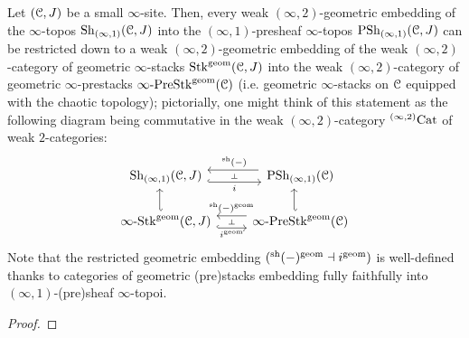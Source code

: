                 \begin{theorem} \label{theorem: (infinity,1)_sheafification_of_derived_geometric_prestacks}
                    Let $(\mathcal{C}, J)$ be a small $\infty$-site. Then, every weak $(\infty, 2)$-geometric embedding of the $\infty$-topos $\mathrm{Sh}_{(\infty, 1)}(\mathcal{C}, J)$ into the $(\infty, 1)$-presheaf $\infty$-topos $\mathrm{PSh}_{(\infty, 1)}(\mathcal{C}, J)$ can be restricted down to a weak $(\infty, 2)$-geometric embedding of the weak $(\infty, 2)$-category of geometric $\infty$-stacks $\mathrm{Stk}^{\mathrm{geom}}(\mathcal{C}, J)$ into the weak $(\infty, 2)$-category of geometric $\infty$-prestacks $\infty\text{-}\mathrm{Pre}\mathrm{Stk}^{\mathrm{geom}}(\mathcal{C})$ (i.e. geometric $\infty$-stacks on $\mathcal{C}$ equipped with the chaotic topology); pictorially, one might think of this statement as the following diagram being commutative in the weak $(\infty, 2)$-category ${}^{(\infty, 2)}\mathrm{Cat}$ of weak $2$-categories: 
                        $$
                            \begin{tikzcd}
                            	{\Sh_{(\infty, 1)}(\C, J)} & {\Psh_{(\infty, 1)}(\C)} \\
                            	{\infty\-\Stk^{\geom}(\C, J)} & {\infty\-\Pre\Stk^{\geom}(\C)}
                            	\arrow[""{name=0, anchor=center, inner sep=0}, "{{}^{\sh}(-)}"', shift right=2, shorten <=2pt, from=1-2, to=1-1]
                            	\arrow[""{name=1, anchor=center, inner sep=0}, "i"', shift right=2, hook, from=1-1, to=1-2]
                            	\arrow[shift left=2, hook', from=2-1, to=1-1]
                            	\arrow[shift left=2, hook', from=2-2, to=1-2]
                            	\arrow[""{name=2, anchor=center, inner sep=0}, "{i^{\geom}}"', shift right=2, hook, from=2-1, to=2-2]
                            	\arrow[""{name=3, anchor=center, inner sep=0}, "{{}^{\sh}(-)^{\geom}}"', shift right=2, from=2-2, to=2-1]
                            	\arrow["\dashv"{anchor=center, rotate=-90}, draw=none, from=0, to=1]
                            	\arrow["\dashv"{anchor=center, rotate=-90}, draw=none, from=3, to=2]
                            \end{tikzcd}
                        $$
                    Note that the restricted geometric embedding $({}^{\mathrm{sh}}(-)^{\mathrm{geom}} \dashv i^{\mathrm{geom}})$ is well-defined thanks to categories of geometric (pre)stacks embedding fully faithfully into $(\infty, 1)$-(pre)sheaf $\infty$-topoi.
                \end{theorem}
                    \begin{proof}
                        
                    \end{proof}
            
